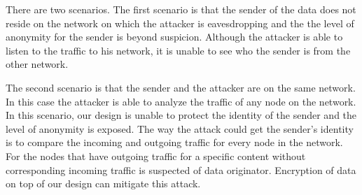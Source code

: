 There are two scenarios. The first scenario is that the sender of the
data does not reside on the network on which the attacker is eavesdropping
and the the level of anonymity for the sender is beyond suspicion. Although
the attacker is able to listen to the traffic to his network, it is
unable to see who the sender is from the other network.

The second scenario is that the sender and the attacker are on the same
network. In this case the attacker is able to analyze the traffic of any
node on the network. In this scenario, our design is unable to protect the
identity of the sender and the level of anonymity is exposed. The way the
attack could get the sender's identity is to compare the incoming and
outgoing traffic for every node in the network. For the nodes that have
outgoing traffic for a specific content without corresponding incoming
traffic is suspected of data originator. Encryption of data on top of our
design can mitigate this attack.
